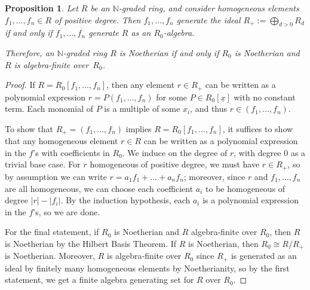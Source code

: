 \documentclass{amsart}[12pt]
\newcommand{\NN}{\mathbb{N}}
\numberwithin{equation}{section}
\theoremstyle{plain} %
\newtheorem{proposition}[equation]{Proposition}
\theoremstyle{definition}
\theoremstyle{remark}
\begin{document}
\begin{proposition}
	Let $R$ be an $\NN$-graded ring, and consider homogeneous elements $f_1,\dots,f_n \in R$ of positive degree. Then $f_1,\dots,f_n$ generate the ideal $R_+ := \bigoplus_{d>0} R_d$ if and only if $f_1,\dots,f_n$ generate $R$ as an $R_0$-algebra.
	
	Therefore, an $\NN$-graded ring $R$ is Noetherian if and only if $R_0$ is Noetherian and $R$ is algebra-finite over~$R_0$.
\end{proposition}
\begin{proof}
	If $R=R_0[f_1,\dots,f_n]$, then any element $r\in R_+$ can be written as a polynomial expression $r=P(f_1,\dots,f_n)$ for some $P\in R_0[\underline{x}]$ with no constant term. Each monomial of $P$ is a multiple of some $x_i$, and thus $r\in (f_1,\dots,f_n)$.
	
	To show that $R_+= (f_1,\dots,f_n)$ implies $R=R_0[f_1,\dots,f_n]$, it suffices to show that any homogeneous element $r\in R$ can be written as a polynomial expression in the $f$'s with coefficients in $R_0$. We induce on the degree of $r$, with degree 0 as a trivial base case. For $r$ homogeneous of positive degree, we must have $r\in R_+$, so by assumption we can write $r= a_1 f_1 + \dots + a_n f_n$; moreover, since $r$ and $f_1, \ldots, f_n$ are all homogeneous, we can choose each coefficient $a_i$ to be homogeneous of degree $|r|-|f_i|$. By the induction hypothesis, each $a_i$ is a polynomial expression in the $f$'s, so we are done.
	
	For the final statement, if $R_0$ is Noetherian and $R$ algebra-finite over $R_0$, then $R$ is Noetherian by the Hilbert Basis Theorem. If $R$ is Noetherian, then $R_0 \cong R/R_+$ is Noetherian. Moreover, $R$ is algebra-finite over $R_0$ since $R_+$ is generated as an ideal by finitely many homogeneous elements by Noetherianity, so  by the first statement, we get a finite algebra generating set for $R$ over $R_0$.
\end{proof}



\end{document}

